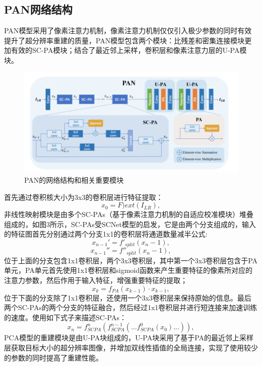 \documentclass{cjc}
\begin{document}
\subsection{PAN网络结构}
PAN\cite{pan}模型采用了像素注意力机制，像素注意力机制仅仅引入极少参数的同时有效提升了超分辨率重建的质量，PAN模型包含两个模块：比残差和密集连接模块更加有效的SC-PA模块；结合了最近邻上采样，卷积层和像素注意力层的U-PA模块。
\begin{figure}[htb]
  \centering
  \includegraphics[width=\linewidth]{image/pan.png}
  \caption{PAN的网络结构和相关重要模块}
\end{figure}
首先通过卷积核大小为3x3的卷积层进行特征提取：
\begin{equation}
x_0 = F){ext}(I_{LR}),
\end{equation}
非线性映射模块是由多个SC-PAs（基于像素注意力机制的自适应校准模块）堆叠组成的，如图3所示，SC-PAs受SCNet\cite{scnet}模型的启发，它是由两个分支组成的，输入的特征图首先分别通过两个分支1x1的卷积层将通道数量减半公式:
\begin{equation}
x_{n-1}'=f'_{split}(x_n-1),
\end{equation}
\begin{equation}
x_{n-1}'' =f''_{split}(x_n-1),
\end{equation}
位于上面的分支包含1x1卷积层，两个3x3卷积层，其中第一个3x3卷积层包含于PA单元，PA单元首先使用1x1卷积层和sigmoid函数来产生重要特征的像素所对应的注意力参数，然后作用于输入特征，增强重要特征的提取；
\begin{equation}
x_k=f_{PA}(x_{k-1})\cdot x_{k-1},
\end{equation}
位于下面的分支除了1x1卷积层，还使用一个3x3卷积层来保持原始的信息。最后两个SC-PAs的两个分支的特征融合，然后经过1x1卷积层并进行短连接来加速训练的速度。使用如下式子来描述SC-PAs：
\begin{equation}
x_n=f^n_{SCPA}(f^{n-1}_{SCPA}(...f^0_{SCPA}(x_0)...)),
\end{equation}
PCA模型的重建模块是由U-PA块组成的，U-PA块采用了基于PA的最近邻上采样层获取目标大小的超分辨率图像，并增加双线性插值的全局连接，实现了使用较少的参数的同时提高了重建性能。
\end{document}
